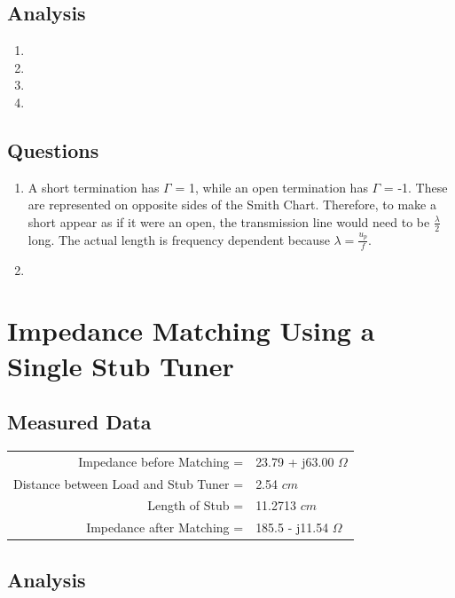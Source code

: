 \documentclass{article}
\begin{document}
\subsection{Analysis}

\begin{enumerate}
	\item
	\item
	\item
	\item
\end{enumerate}

\subsection{Questions}

\begin{enumerate}
	\item A short termination has $\Gamma$ = 1, while an open termination has $\Gamma$ = -1. These are represented on opposite sides of the Smith Chart. Therefore, to make a short appear as if it were an open, the transmission line would need to be $\frac{\lambda}{2}$ long. The actual length is frequency dependent because $\lambda = \frac{u_p}{f}$.
	\item
\end{enumerate}


\section{Impedance Matching Using a Single Stub Tuner}

\subsection{Measured Data}

\begin{table}[H]
\centering
	\begin{tabular}{rl}
	Impedance before Matching =   			 & 23.79 + j63.00 $\Omega$  \\
	Distance between Load and Stub Tuner =   & 2.54 $cm$  \\
	Length of Stub =   						 & 11.2713 $cm$  \\
	Impedance after Matching =  			 & 185.5 - j11.54 $\Omega$      
	\end{tabular}
\end{table}

\subsection{Analysis}
\end{document}
